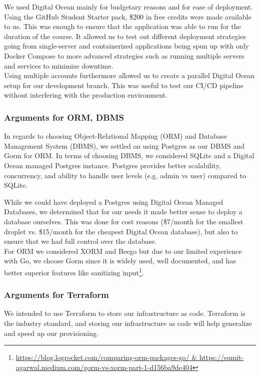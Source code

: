 We used Digital Ocean mainly for budgetary reasons and for ease of deployment. Using the GitHub Student Starter pack, \$200 in free credits were made available to us. This was enough to ensure that the application 
was able to run for the duration of the course. It allowed us to test out different deployment strategies going from single-server and containerized applications being spun up with only Docker Compose to more advanced strategies such as running multiple servers and services to minimize downtime.\\

Using multiple accounts furthermore allowed us to create a parallel Digital Ocean setup for our development branch.
This was useful to test our CI/CD pipeline without interfering with the production environment.

\subsubsection{Arguments for ORM, DBMS}
In regards to choosing Object-Relational Mapping (ORM) and Database Management System (DBMS), we settled on using Postgres as our DBMS and Gorm for ORM. In terms of choosing DBMS, we considered SQLite and a Digital Ocean managed Postgres instance. Postgres provides better scalability, concurrency, and ability
to handle user levels (e.g. admin vs user) compared to SQLite.

While we could have deployed a Postgres using Digital Ocean Managed Databases, we determined that for our needs it made 
better sense to deploy a database ourselves. This was done for cost reasons (\$7/month for the smallest droplet vs. \$15/month 
for the cheapest Digital Ocean database), but also to ensure that we had full control over the database.\\

For ORM we considered XORM and Beego but due to our limited experience with Go, we choose Gorm 
since it is widely used, well documented, and has better superior features like sanitizing input\footnote{\url{https://blog.logrocket.com/comparing-orm-packages-go/ & https://sumit-agarwal.medium.com/gorm-vs-xorm-part-1-d156ba9de404}}.

\subsubsection{Arguments for Terraform}
We intended to use Terraform to store our infrastructure as code. Terraform is the industry standard, and storing our infrastructure as code will help generalize and speed up our provisioning. 
\newpage

